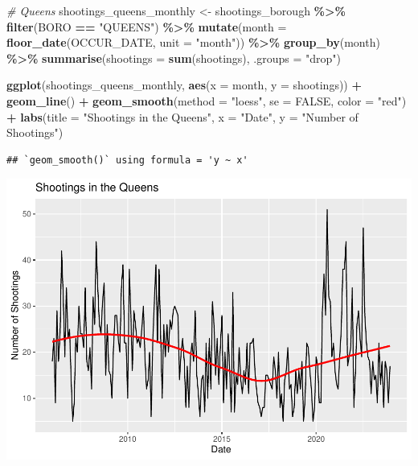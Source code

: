 \documentclass[
]{article}
\newenvironment{Shaded}{\begin{snugshade}}{\end{snugshade}}
\newcommand{\AttributeTok}[1]{\textcolor[rgb]{0.13,0.29,0.53}{#1}}
\newcommand{\CommentTok}[1]{\textcolor[rgb]{0.56,0.35,0.01}{\textit{#1}}}
\newcommand{\ConstantTok}[1]{\textcolor[rgb]{0.56,0.35,0.01}{#1}}
\newcommand{\FunctionTok}[1]{\textcolor[rgb]{0.13,0.29,0.53}{\textbf{#1}}}
\newcommand{\NormalTok}[1]{#1}
\newcommand{\OtherTok}[1]{\textcolor[rgb]{0.56,0.35,0.01}{#1}}
\newcommand{\SpecialCharTok}[1]{\textcolor[rgb]{0.81,0.36,0.00}{\textbf{#1}}}
\newcommand{\StringTok}[1]{\textcolor[rgb]{0.31,0.60,0.02}{#1}}
\begin{document}
\begin{Shaded}
\begin{Highlighting}[]
\CommentTok{\# Queens}
\NormalTok{shootings\_queens\_monthly }\OtherTok{\textless{}{-}}\NormalTok{ shootings\_borough }\SpecialCharTok{\%\textgreater{}\%}
  \FunctionTok{filter}\NormalTok{(BORO }\SpecialCharTok{==} \StringTok{"QUEENS"}\NormalTok{) }\SpecialCharTok{\%\textgreater{}\%}
  \FunctionTok{mutate}\NormalTok{(}\AttributeTok{month =} \FunctionTok{floor\_date}\NormalTok{(OCCUR\_DATE, }\AttributeTok{unit =} \StringTok{"month"}\NormalTok{)) }\SpecialCharTok{\%\textgreater{}\%}
  \FunctionTok{group\_by}\NormalTok{(month) }\SpecialCharTok{\%\textgreater{}\%}
  \FunctionTok{summarise}\NormalTok{(}\AttributeTok{shootings =} \FunctionTok{sum}\NormalTok{(shootings), }\AttributeTok{.groups =} \StringTok{"drop"}\NormalTok{)}

\FunctionTok{ggplot}\NormalTok{(shootings\_queens\_monthly, }\FunctionTok{aes}\NormalTok{(}\AttributeTok{x =}\NormalTok{ month, }\AttributeTok{y =}\NormalTok{ shootings)) }\SpecialCharTok{+}
  \FunctionTok{geom\_line}\NormalTok{() }\SpecialCharTok{+}
  \FunctionTok{geom\_smooth}\NormalTok{(}\AttributeTok{method =} \StringTok{"loess"}\NormalTok{, }\AttributeTok{se =} \ConstantTok{FALSE}\NormalTok{, }\AttributeTok{color =} \StringTok{"red"}\NormalTok{) }\SpecialCharTok{+}
  \FunctionTok{labs}\NormalTok{(}\AttributeTok{title =} \StringTok{"Shootings in the Queens"}\NormalTok{,}
       \AttributeTok{x =} \StringTok{"Date"}\NormalTok{,}
       \AttributeTok{y =} \StringTok{"Number of Shootings"}\NormalTok{)}
\end{Highlighting}
\end{Shaded}

\begin{verbatim}
## `geom_smooth()` using formula = 'y ~ x'
\end{verbatim}

\includegraphics{nypd-shooting-data-analysis_files/figure-latex/trend-shootings-queens-1.pdf}
\end{document}
